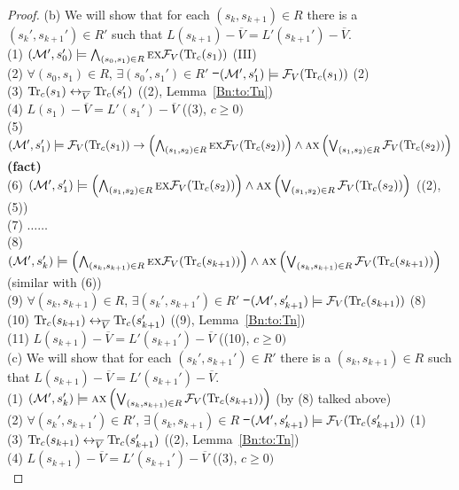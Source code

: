 \documentclass{article}
\begin{document}
\begin{proof}
        (b) We will show that for each $(s_k, s_{k+1}) \in R$ there is a $(s_k', s_{k+1}') \in R'$ such that $L(s_{k+1}) - \overline V = L'(s_{k+1}') - \overline V$.\\
        (1) $({\cal M}', s_0') \models \bigwedge_{(s_0, s_1) \in R} \textsc{e} \textsc{x} {\cal F}_V(\textrm{Tr}_c(s_1))$  \hfill  (III)\\
        (2) $\forall (s_0, s_1) \in R$, $\exists (s_0', s_1') \in R'$ \st\ $({\cal M}', s_1') \models {\cal F}_V(\textrm{Tr}_c(s_1))$  \hfill  (2)\\
        (3) $\textrm{Tr}_c(s_1) \leftrightarrow_{\overline V} \textrm{Tr}_c(s_1')$  \hfill  ((2), Lemma~\ref{Bn:to:Tn}) \\
        (4) $L(s_1) - \overline V = L'(s_1') - \overline V$  \hfill   ((3), $c \geq 0)$\\
        (5) $({\cal M}', s_1') \models {\cal F}_V(\textrm{Tr}_c(s_1)) \rightarrow \left(\bigwedge_{(s_1,s_2)\in R} \textsc{e} \textsc{x} {\cal F}_V(\textrm{Tr}_c(s_2))\right) \wedge \textsc{a} \textsc{x} \left(\bigvee_{(s_1,s_2)\in R} {\cal F}_V(\textrm{Tr}_c(s_2))\right)$     \hfill  \textbf{(fact)}\\
        (6) $({\cal M}', s_1') \models \left(\bigwedge_{(s_1,s_2)\in R} \textsc{e} \textsc{x} {\cal F}_V(\textrm{Tr}_c(s_2))\right) \wedge \textsc{a} \textsc{x} \left(\bigvee_{(s_1,s_2)\in R} {\cal F}_V(\textrm{Tr}_c(s_2))\right)$ \hfill ((2), (5))\\
        (7) $\dots \dots$ \\
        (8) $({\cal M}', s_k') \models \left(\bigwedge_{(s_k,s_{k+1})\in R} \textsc{e} \textsc{x} {\cal F}_V(\textrm{Tr}_c(s_{k+1}))\right) \wedge \textsc{a} \textsc{x} \left(\bigvee_{(s_k,s_{k+1})\in R} {\cal F}_V(\textrm{Tr}_c(s_{k+1}))\right)$       \hfill (similar with (6))\\
        (9) $\forall (s_k, s_{k+1}) \in R$, $\exists (s_k', s_{k+1}') \in R'$ \st\ $({\cal M}', s_{k+1}') \models {\cal F}_V(\textrm{Tr}_c(s_{k+1}))$  \hfill  (8)\\
        (10) $\textrm{Tr}_c(s_{k+1}) \leftrightarrow_{\overline V} \textrm{Tr}_c(s_{k+1}')$    \hfill ((9), Lemma~\ref{Bn:to:Tn}) \\
        (11) $L(s_{k+1}) - \overline V = L'(s_{k+1}') - \overline V$  \hfill   ((10), $c \geq 0)$\\

        (c) We will show that for each $(s_k', s_{k+1}') \in R'$ there is a $(s_k, s_{k+1})\in R$ such that $L(s_{k+1}) - \overline V = L'(s_{k+1}') - \overline V$.\\
        (1) $({\cal M}', s_k') \models \textsc{a} \textsc{x} \left(\bigvee_{(s_k,s_{k+1})\in R} {\cal F}_V(\textrm{Tr}_c(s_{k+1}))\right)$  \hfill (by (8) talked above)\\
        (2) $\forall (s_k', s_{k+1}') \in R'$, $\exists (s_k, s_{k+1}) \in R$ \st\ $({\cal M}', s_{k+1}') \models {\cal F}_V(\textrm{Tr}_c(s_{k+1}'))$  \hfill (1) \\
        (3) $\textrm{Tr}_c(s_{k+1}) \leftrightarrow_{\overline V} \textrm{Tr}_c(s_{k+1}')$    \hfill ((2), Lemma~\ref{Bn:to:Tn}) \\
        (4) $L(s_{k+1}) - \overline V = L'(s_{k+1}') - \overline V$  \hfill   ((3), $c \geq 0)$\\


\end{proof}
\end{document}

